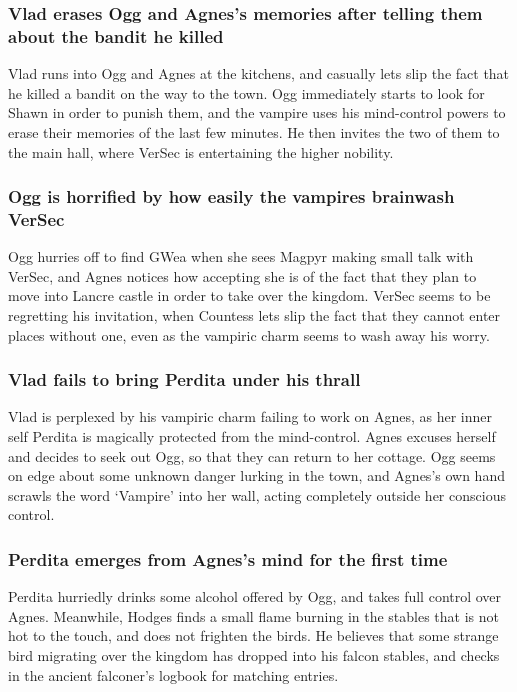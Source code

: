 \subsubsection{\Gls{Vlad} erases \Gls{Ogg} and \Gls{Agnes}'s memories after telling them about
    the bandit he killed}
\Gls{Vlad} runs into \Gls{Ogg} and \Gls{Agnes} at the kitchens, and casually lets slip the fact
that he killed a bandit on the way to the town. \Gls{Ogg} immediately starts to look for \Gls{Shawn}
in order to punish them, and the vampire uses his mind-control powers to erase their memories of the
last few minutes. He then invites the two of them to the main hall, where \Gls{VerSec} is
entertaining the higher nobility.

\subsubsection{\Gls{Ogg} is horrified by how easily the vampires brainwash \Gls{VerSec}}
\Gls{Ogg} hurries off to find \Gls{GWea} when she sees \Gls{Magpyr} making small talk with
\Gls{VerSec}, and \Gls{Agnes} notices how accepting she is of the fact that they plan to move into
Lancre castle in order to take over the kingdom. \Gls{VerSec} seems to be regretting his invitation,
when \Gls{Countess} lets slip the fact that they cannot enter places without one, even as the
vampiric charm seems to wash away his worry.

\subsubsection{\Gls{Vlad} fails to bring \Gls{Perdita} under his thrall}
\Gls{Vlad} is perplexed by his vampiric charm failing to work on \Gls{Agnes}, as her inner self
\Gls{Perdita} is magically protected from the mind-control. \Gls{Agnes} excuses herself and
decides to seek out \Gls{Ogg}, so that they can return to her cottage. \Gls{Ogg} seems on edge about
some unknown danger lurking in the town, and \Gls{Agnes}'s own hand scrawls the word `Vampire'
into her wall, acting completely outside her conscious control.

\subsubsection{\Gls{Perdita} emerges from \Gls{Agnes}'s mind for the first time}
\Gls{Perdita} hurriedly drinks some alcohol offered by \Gls{Ogg}, and takes full control over
\Gls{Agnes}. Meanwhile, \Gls{Hodges} finds a small flame burning in the stables that is not hot to
the touch, and does not frighten the birds. He believes that some strange bird migrating over the
kingdom has dropped into his falcon stables, and checks in the ancient falconer's logbook for
matching entries.

